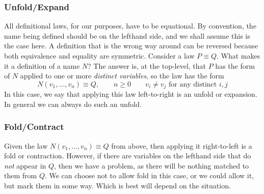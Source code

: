 \subsubsection*{Unfold/Expand}

All definitional laws, for our purposes, have to be equational.
By convention, the name being defined should be on the lefthand side,
and we shall assume this is the case here.
A definition that is the wrong way around can be reversed because both
equivalence and equality are symmetric.
Consider a law $P \equiv Q$. What makes it a definition of a name $N$?
The answer is, 
at the top-level,
that $P$ has the form of $N$ applied to one or more \emph{distinct variables}, 
so the law has the form
$$
   N(v_1,\dots,v_n) \equiv Q, 
   \qquad n \geq 0
   \qquad v_i \neq v_j \mbox{ for any distinct } i,j
$$
In this case, we say that applying this law left-to-right
is an unfold or expansion.
In general we can always do such an unfold.


\subsubsection*{Fold/Contract}

Given the law $N(v_1,\dots,v_n) \equiv Q$ from above,
then applying it right-to-left is a fold or contraction.
However, 
if there are variables on the lefthand side that do \emph{not} appear in $Q$,
then we have a problem, as there will be nothing matched to them from $Q$.
We can choose not to allow fold in this case,
or we could allow it, but mark them in some way.
Which is best will depend on the situation.


